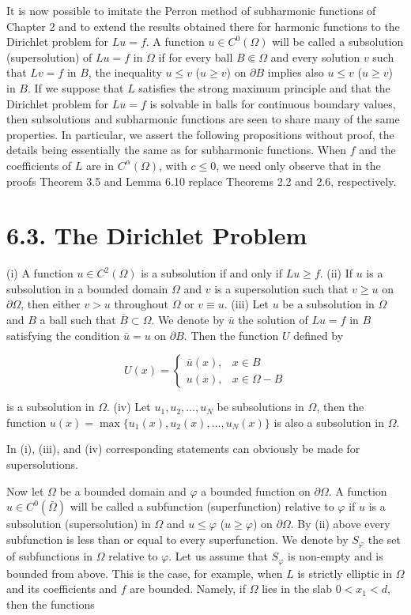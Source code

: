 It is now possible to imitate the Perron method of subharmonic functions of Chapter 2 and to extend the results obtained there for harmonic functions to the Dirichlet problem for $Lu=f$. A function $u \in C^0(\Omega)$ will be called a subsolution (supersolution) of $Lu=f$ in $\Omega$ if for every ball $B \Subset \Omega$ and every solution $v$ such that $Lv=f$ in $B$, the inequality $u \leq v$ ($u \geq v$) on $\partial B$ implies also $u \leq v$ ($u \geq v$) in $B$. If we suppose that $L$ satisfies the strong maximum principle and that the Dirichlet problem for $Lu=f$ is solvable in balls for continuous boundary values, then subsolutions and subharmonic functions are seen to share many of the same properties. In particular, we assert the following propositions without proof, the details being essentially the same as for subharmonic functions. When $f$ and the coefficients of $L$ are in $C^\alpha(\Omega)$, with $c \leq 0$, we need only observe that in the proofs Theorem 3.5 and Lemma 6.10 replace Theorems 2.2 and 2.6, respectively.



\section*{6.3. The Dirichlet Problem}

(i) A function $u \in C^2(\Omega)$ is a subsolution if and only if $Lu \ge f$.
(ii) If $u$ is a subsolution in a bounded domain $\Omega$ and $v$ is a supersolution such that
$v \ge u$ on $\partial\Omega$, then either $v > u$ throughout $\Omega$ or $v \equiv u$.
(iii) Let $u$ be a subsolution in $\Omega$ and $B$ a ball such that $\overline{B} \subset \Omega$. We denote by $\bar{u}$
the solution of $Lu = f$ in $B$ satisfying the condition $\bar{u} = u$ on $\partial B$. Then the function
$U$ defined by

\[
U(x) =
\begin{cases}
\bar{u}(x), & x \in B \\
u(x), & x \in \Omega - B
\end{cases}
\]

is a subsolution in $\Omega$.
(iv) Let $u_1, u_2, \ldots, u_N$ be subsolutions in $\Omega$, then the function
$u(x) = \max\{u_1(x), u_2(x), \ldots, u_N(x)\}$ is also a subsolution in $\Omega$.

In (i), (iii), and (iv) corresponding statements can obviously be made for supersolutions.

Now let $\Omega$ be a bounded domain and $\varphi$ a bounded function on $\partial\Omega$. A function
$u \in C^0(\bar{\Omega})$ will be called a subfunction (superfunction) relative to $\varphi$ if $u$ is a subsolution
(supersolution) in $\Omega$ and $u \le \varphi$ ($u \ge \varphi$) on $\partial\Omega$. By (ii) above every subfunction is less
than or equal to every superfunction. We denote by $S_\varphi$ the set of subfunctions in
$\Omega$ relative to $\varphi$. Let us assume that $S_\varphi$ is non-empty and is bounded from above.
This is the case, for example, when $L$ is strictly elliptic in $\Omega$ and its coefficients and
$f$ are bounded. Namely, if $\Omega$ lies in the slab $0 < x_1 < d$, then the functions

